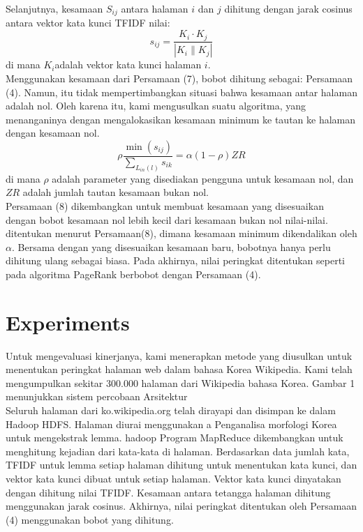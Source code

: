 \documentclass[conference]{IEEEtran}
\begin{document}
        Selanjutnya, kesamaan ${S_{ij}}$ antara halaman $i$ dan $j$ dihitung
        dengan jarak cosinus antara vektor kata kunci TFIDF nilai:
        \begin{equation}
            s_{i j}=\frac{K_{i} \cdot K_{j}}{\left|K_{i} \| K_{j}\right|}
            \end{equation}
            di mana $K_i$adalah vektor kata kunci halaman $i$.\\

            Menggunakan kesamaan dari Persamaan (7), bobot dihitung sebagai:
Persamaan (4). Namun, itu tidak mempertimbangkan situasi bahwa kesamaan antar halaman adalah nol. Oleh karena itu, kami mengusulkan suatu algoritma, yang
menanganinya dengan mengalokasikan kesamaan minimum ke tautan ke
halaman dengan kesamaan nol.
\begin{equation}
    \rho \frac{\min \left(s_{i j}\right)}{\sum_{L_{i n}(l)} s_{i k}}=\alpha(1-\rho) Z R
    \end{equation}
    di mana $\rho$ adalah parameter yang disediakan pengguna untuk kesamaan nol,
dan $ZR$ adalah jumlah tautan kesamaan bukan nol.\\

Persamaan (8) dikembangkan untuk membuat kesamaan yang disesuaikan dengan
bobot kesamaan nol lebih kecil dari kesamaan bukan nol
nilai-nilai. ditentukan menurut Persamaan(8), dimana
kesamaan minimum dikendalikan oleh $\alpha$. Bersama dengan yang disesuaikan
kesamaan baru, bobotnya hanya perlu dihitung ulang sebagai
biasa. Pada akhirnya, nilai peringkat ditentukan seperti pada
algoritma PageRank berbobot dengan Persamaan (4).
    \section{Experiments}
    Untuk mengevaluasi kinerjanya, kami menerapkan
    metode yang diusulkan untuk menentukan peringkat halaman web dalam bahasa Korea
    Wikipedia. Kami telah mengumpulkan sekitar 300.000 halaman dari
    Wikipedia bahasa Korea. Gambar 1 menunjukkan sistem percobaan
    Arsitektur\\

    Seluruh halaman dari ko.wikipedia.org telah dirayapi dan
disimpan ke dalam Hadoop HDFS. Halaman diurai menggunakan a
Penganalisa morfologi Korea untuk mengekstrak lemma. hadoop
Program MapReduce dikembangkan untuk menghitung kejadian
dari kata-kata di halaman. Berdasarkan data jumlah kata,
TFIDF untuk lemma setiap halaman dihitung untuk
menentukan kata kunci, dan vektor kata kunci dibuat untuk
setiap halaman. Vektor kata kunci dinyatakan dengan
dihitung nilai TFIDF. Kesamaan antara tetangga
halaman dihitung menggunakan jarak cosinus. Akhirnya,
nilai peringkat ditentukan oleh Persamaan (4) menggunakan bobot yang dihitung.\\
\end{document}
